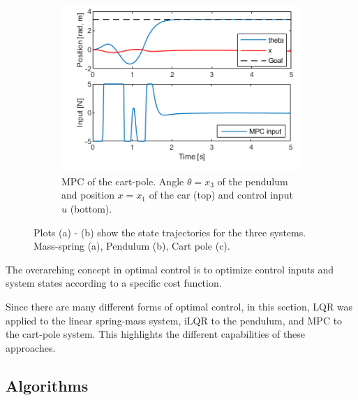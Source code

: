 \documentclass[letterpaper, 10 pt, conference]{ieeeconf}  %
\begin{document}
\begin{figure}[!thp]
\begin{subfigure}{0.325\textwidth}
	\end{subfigure}
	\begin{subfigure}{0.325\textwidth}
		\includegraphics[width=\textwidth]{CP.png}
		\caption{MPC of the cart-pole. Angle $\theta=x_3$ of the pendulum and position $x=x_1$ of the car (top) and control input $u$ (bottom).}\label{fig:JanCP}
	\end{subfigure}\caption{Plots (a) - (b) show the state trajectories for the three systems. Mass-spring (a), Pendulum (b), Cart pole (c).}\label{fig:PILCO}
\end{figure} 
The overarching concept in optimal control is to optimize control inputs and system states according to a specific cost function. 


Since there are many different forms of optimal control, in this section, LQR was applied to the linear spring-mass system, iLQR to the pendulum, and MPC to the cart-pole system. This highlights the different capabilities of these approaches.
\subsection{Algorithms}
\end{document}
